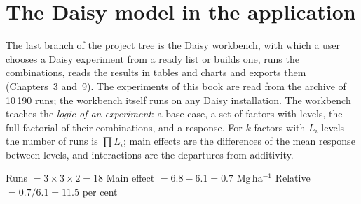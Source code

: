 \section{The Daisy model in the application}
The last branch of the project tree is the Daisy workbench, with which a user chooses a Daisy experiment from a ready list or builds one, runs the combinations, reads the results in tables and charts and exports them (Chapters~3 and~9). The experiments of this book are read from the archive of 10\,190 runs; the workbench itself runs on any Daisy installation. The workbench teaches the \emph{logic of an experiment}: a base case, a set of factors with levels, the full factorial of their combinations, and a response. For $k$ factors with $L_i$ levels the number of runs is $\prod L_i$; main effects are the differences of the mean response between levels, and interactions are the departures from additivity.

\sol Runs $=3\times3\times2=18$ \ans Main effect $=6.8-6.1=0.7$ Mg\,ha$^{-1}$ \ans Relative $=0.7/6.1=11.5$ per cent \finans

